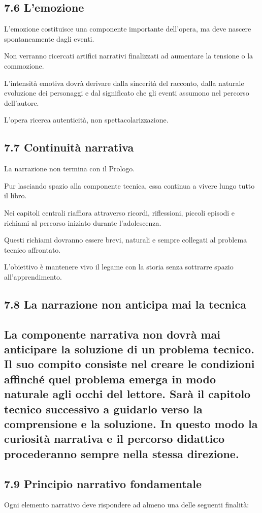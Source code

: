 \documentclass{article}
\begin{document}
\subsection[7.6 L{}'emozione]{7.6 L'emozione}
L'emozione costituisce una componente importante dell'opera, ma deve nascere spontaneamente dagli eventi.

Non verranno ricercati artifici narrativi finalizzati ad aumentare la tensione o la commozione.

L'intensità emotiva dovrà derivare dalla sincerità del racconto, dalla naturale evoluzione dei personaggi e dal
significato che gli eventi assumono nel percorso dell'autore.

L'opera ricerca autenticità, non spettacolarizzazione.

\subsection{7.7 Continuità narrativa}
La narrazione non termina con il Prologo.

Pur lasciando spazio alla componente tecnica, essa continua a vivere lungo tutto il libro.

Nei capitoli centrali riaffiora attraverso ricordi, riflessioni, piccoli episodi e richiami al percorso iniziato durante
l'adolescenza.

Questi richiami dovranno essere brevi, naturali e sempre collegati al problema tecnico affrontato.

L'obiettivo è mantenere vivo il legame con la storia senza sottrarre spazio all'apprendimento.

\subsection{7.8 La narrazione non anticipa mai la tecnica}
\subsection{La componente narrativa non dovrà mai anticipare la soluzione di un problema tecnico. Il suo compito
consiste nel creare le condizioni affinché quel problema emerga in modo naturale agli occhi del lettore. Sarà il
capitolo tecnico successivo a guidarlo verso la comprensione e la soluzione. In questo modo la curiosità narrativa e il
percorso didattico procederanno sempre nella stessa direzione.}
\subsection{7.9 Principio narrativo fondamentale}
Ogni elemento narrativo deve rispondere ad almeno una delle seguenti finalità:
\end{document}
